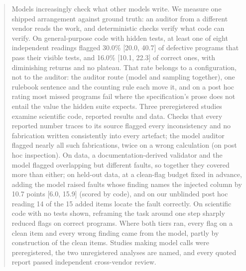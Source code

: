\documentclass{article}
\begin{document}

\printAffiliationsAndNotice{}

\begin{abstract}
Models increasingly check what other models write. We measure one shipped arrangement against ground truth: an auditor from a different vendor reads the work, and deterministic
checks verify what code can verify. On general-purpose code with hidden tests, at least one of eight
independent readings flagged 30.0\% [20.0, 40.7] of defective programs that pass their visible
tests, and 16.0\% [10.1, 22.3] of correct ones, with diminishing returns and no plateau. That rate
belongs to a configuration, not to the auditor: the auditor route (model and sampling together),
one rulebook sentence and the counting rule each move it, and on a post hoc rating most missed programs fail where the specification's prose does not entail the value the hidden suite expects. Three preregistered studies examine
scientific code, reported results and data. Checks that every reported number traces to its source
flagged every inconsistency and no fabrication written consistently into every artefact;
the model auditor flagged nearly all such fabrications, twice on a wrong calculation
(on post hoc inspection). On data, a
documentation-derived validator and the model flagged overlapping but different faults, so together they covered more than either; on held-out data, at a clean-flag budget fixed in advance, adding the model raised faults whose finding names the injected column by 10.7 points [6.0, 15.9] (scored by code), and on our unblinded post hoc reading 14 of the 15 added items locate the fault correctly. On scientific code with no tests shown, reframing the task around one
step sharply reduced flags on correct programs. Where both tiers ran, every flag on a clean item and
every wrong finding came from the model, partly by construction of the clean items. Studies making model calls were preregistered, the two
unregistered analyses are named, and every quoted report passed independent cross-vendor review.
\end{abstract}
\end{document}
